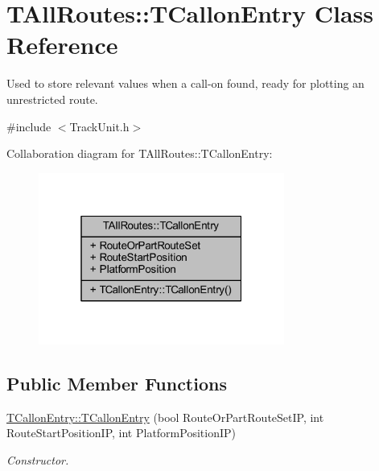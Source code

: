 \hypertarget{class_t_all_routes_1_1_t_callon_entry}{}\section{T\+All\+Routes\+:\+:T\+Callon\+Entry Class Reference}
\label{class_t_all_routes_1_1_t_callon_entry}


Used to store relevant values when a call-\/on found, ready for plotting an unrestricted route.  




{\ttfamily \#include $<$Track\+Unit.\+h$>$}



Collaboration diagram for T\+All\+Routes\+:\+:T\+Callon\+Entry\+:\nopagebreak
\begin{figure}[H]
\begin{center}
\leavevmode
\includegraphics[width=229pt]{class_t_all_routes_1_1_t_callon_entry__coll__graph}
\end{center}
\end{figure}
\subsection*{Public Member Functions}
\begin{DoxyCompactItemize}
\item 
\mbox{\label{class_t_all_routes_1_1_t_callon_entry_a3e9f581932629ac09a2e9ccb86aec280}} 
\mbox{\hyperlink{class_t_all_routes_1_1_t_callon_entry_a3e9f581932629ac09a2e9ccb86aec280}{T\+Callon\+Entry\+::\+T\+Callon\+Entry}} (bool Route\+Or\+Part\+Route\+Set\+IP, int Route\+Start\+Position\+IP, int Platform\+Position\+IP)
\begin{DoxyCompactList}\small\item\em Constructor. \end{DoxyCompactList}\end{DoxyCompactItemize}
